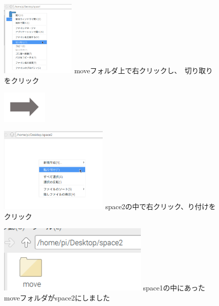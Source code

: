 \documentclass[a4paper,12pt]{jarticle}
\begin{document}
\begin{figure}[ht]
  \centering
  \begin{minipage}{6.589cm}
    \includegraphics[width=3.584cm,height=3.658cm]{textbook-img048.png}
    {
      moveフォルダ上で右クリックし、　切り取りをクリック
    }
  \end{minipage}
  \includegraphics[width=2.168cm,height=1.542cm]{textbook-img049.png}
  \begin{minipage}{6.589cm}
    \includegraphics[width=5.225cm,height=4.119cm]{textbook-img046.png}
    {
      space2の中で右クリック、り付けをクリック
    }
  \end{minipage}

  \begin{minipage}{6.589cm}
    \includegraphics[width=7.218cm,height=3.281cm]{textbook-img045.png}
    {
      space1の中にあったmoveフォルダがspace2にしました
    }
  \end{minipage}


\end{figure}
\end{document}
